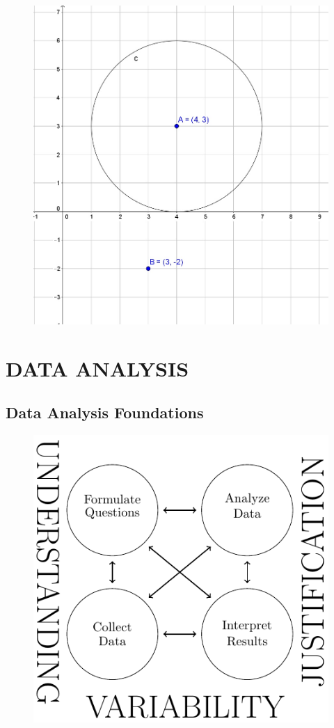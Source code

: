 \documentclass[
]{book}
\theoremstyle{definition}
\theoremstyle{definition}
\theoremstyle{definition}
\theoremstyle{definition}
\theoremstyle{remark}
\begin{document}
\begin{figure}

{\centering \includegraphics[width=0.7\linewidth]{images/circledilation} 

}

\end{figure}

\hypertarget{part-data-analysis}{%
\part{DATA ANALYSIS}\label{part-data-analysis}}

\hypertarget{data1}{%
\chapter{Data Analysis Foundations}\label{data1}}

\begin{figure}

{\centering \includegraphics[width=0.7\linewidth]{tikz/GAISE2} 

}

\end{figure}
\end{document}
